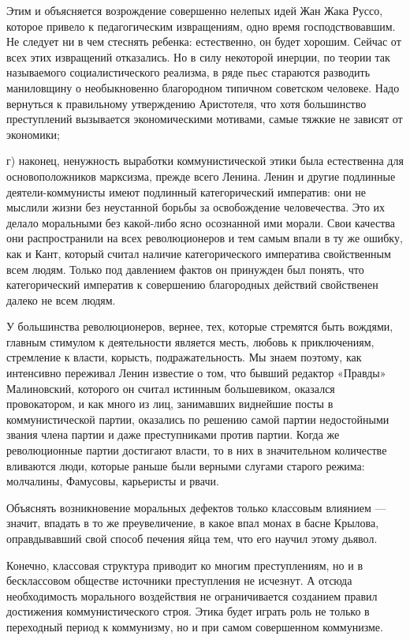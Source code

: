 Этим и объясняется возрождение совершенно нелепых идей Жан Жака Руссо,
которое привело к педагогическим извращениям, одно время
господствовавшим. Не следует ни в чем стеснять ребенка: естественно,
он будет хорошим. Сейчас от всех этих извращений отказались. Но в силу
некоторой инерции, по теории так называемого социалистического
реализма, в ряде пьес стараются разводить маниловщину о необыкновенно
благородном типичном советском человеке. Надо вернуться к правильному
утверждению Аристотеля, что хотя большинство преступлений вызывается
экономическими мотивами, самые тяжкие не зависят от экономики;

г) наконец, ненужность выработки коммунистической этики была
естественна для основоположников марксизма, прежде всего Ленина. Ленин
и другие подлинные деятели-коммунисты имеют подлинный категорический
императив: они не мыслили жизни без неустанной борьбы за освобождение
человечества. Это их делало моральными без какой-либо ясно осознанной
ими морали. Свои качества они распространили на всех революционеров и
тем самым впали в ту же ошибку, как и Кант, который считал наличие
категорического императива свойственным всем людям. Только под
давлением фактов он принужден был понять, что категорический императив
к совершению благородных действий свойственен далеко не всем людям.

У большинства революционеров, вернее, тех, которые стремятся быть
вождями, главным стимулом к деятельности является месть, любовь к
приключениям, стремление к власти, корысть, подражательность. Мы
знаем поэтому, как интенсивно переживал Ленин известие о том, что
бывший редактор «Правды» Малиновский, которого он считал истинным
большевиком, оказался провокатором, и как много из лиц, занимавших
виднейшие посты в коммунистической партии, оказались по решению самой
партии недостойными звания члена партии и даже преступниками против
партии. Когда же революционные партии достигают власти, то в них в
значительном количестве вливаются люди, которые раньше были верными
слугами старого режима: молчалины, Фамусовы, карьеристы и рвачи.

Объяснять возникновение моральных дефектов только классовым влиянием
--- значит, впадать в то же преувеличение, в какое впал монах в басне
Крылова, оправдывавший свой способ печения яйца тем, что его научил
этому дьявол.

Конечно, классовая структура приводит ко многим преступлениям, но и в
бесклассовом обществе источники преступления не исчезнут. А отсюда
необходимость морального воздействия не ограничивается созданием
правил достижения коммунистического строя. Этика будет играть роль не
только в переходный период к коммунизму, но и при самом совершенном
коммунизме.


